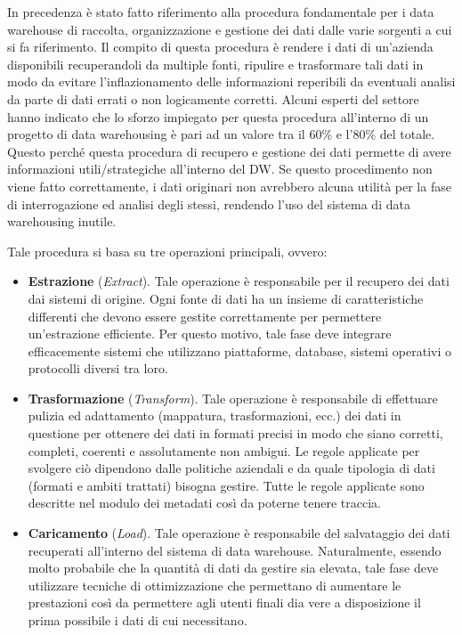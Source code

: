 In precedenza è stato fatto riferimento alla procedura fondamentale per i data warehouse di raccolta, organizzazione e gestione dei dati dalle varie sorgenti a cui si fa riferimento. Il compito di questa procedura è rendere i dati di un'azienda disponibili recuperandoli da multiple fonti, ripulire e trasformare tali dati in modo da evitare l'inflazionamento delle informazioni reperibili da eventuali analisi da parte di dati errati o non logicamente corretti. Alcuni esperti del settore hanno indicato che lo sforzo impiegato per questa procedura all'interno di un progetto di data warehousing è pari ad un valore tra il 60\% e l'80\% del totale. Questo perché questa procedura di recupero e gestione dei dati permette di avere informazioni utili/strategiche all'interno del DW. Se questo procedimento non viene fatto correttamente, i dati originari non avrebbero alcuna utilità per la fase di interrogazione ed analisi degli stessi, rendendo l'uso del sistema di data warehousing inutile.\cite{researchgate_etl_process}

Tale procedura si basa su tre operazioni principali, ovvero:\cite{sciencedirect_data_warehouse_model}
\begin{itemize}
    \item \textbf{Estrazione} (\textit{Extract}). Tale operazione è responsabile per il recupero dei dati dai sistemi di origine. Ogni fonte di dati ha un insieme di caratteristiche differenti che devono essere gestite correttamente per permettere un'estrazione efficiente. Per questo motivo, tale fase deve integrare efficacemente sistemi che utilizzano piattaforme, database, sistemi operativi o protocolli diversi tra loro.
    \item \textbf{Trasformazione} (\textit{Transform}). Tale operazione è responsabile di effettuare pulizia ed adattamento (mappatura, trasformazioni, ecc.) dei dati in questione per ottenere dei dati in formati precisi in modo che siano corretti, completi, coerenti e assolutamente non ambigui. Le regole applicate per svolgere ciò dipendono dalle politiche aziendali e da quale tipologia di dati (formati e ambiti trattati) bisogna gestire. Tutte le regole applicate sono descritte nel modulo dei metadati così da poterne tenere traccia.
    \item \textbf{Caricamento} (\textit{Load}). Tale operazione è responsabile del salvataggio dei dati recuperati all'interno del sistema di data warehouse. Naturalmente, essendo molto probabile che la quantità di dati da gestire sia elevata, tale fase deve utilizzare tecniche di ottimizzazione che permettano di aumentare le prestazioni così da permettere agli utenti finali dia vere a disposizione il prima possibile i dati di cui necessitano.
\end{itemize}

